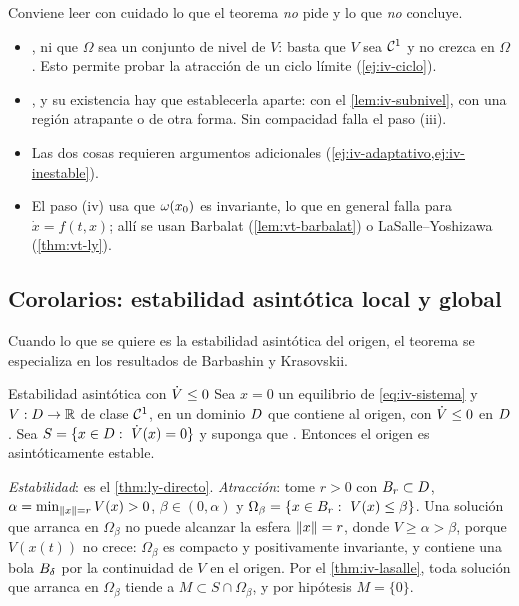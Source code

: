Conviene leer con cuidado lo que el teorema \emph{no} pide y lo que \emph{no} concluye.
\begin{itemize}
  \item {}, ni que $\Omega$ sea un conjunto de nivel de $V$: basta que $V$ sea $\mathcal{C}^{1}$ y no crezca en $\Omega$. Esto permite probar la atracción de un ciclo límite (\cref{ej:iv-ciclo}).
  \item {}, y su existencia hay que establecerla aparte: con el \cref{lem:iv-subnivel}, con una región atrapante o de otra forma. Sin compacidad falla el paso (iii).
  \item {} Las dos cosas requieren argumentos adicionales (\cref{ej:iv-adaptativo,ej:iv-inestable}).
  \item {} El paso (iv) usa que $\omega(x_0)$ es invariante, lo que en general falla para $\dot x=f(t,x)$; allí se usan Barbalat (\cref{lem:vt-barbalat}) o LaSalle--Yoshizawa (\cref{thm:vt-ly}).
\end{itemize}

\subsection{Corolarios: estabilidad asintótica local y global}

Cuando lo que se quiere es la estabilidad asintótica del origen, el teorema se especializa en los resultados de Barbashin y Krasovskii.

\begin{corolario}[label=cor:iv-as]{Estabilidad asintótica con $\dot V\le0$ \citep[Cor.~4.1]{Kha02}}
Sea $x=0$ un equilibrio de \eqref{eq:iv-sistema} y $V:D\to\mathbb{R}$ de clase $\mathcal{C}^{1}$,  en un dominio $D$ que contiene al origen, con $\dot V\le0$ en $D$. Sea $S=\{x\in D:\ \dot V(x)=0\}$ y suponga que . Entonces el origen es asintóticamente estable.
\end{corolario}

\begin{demostracion}
\emph{Estabilidad}: es el \cref{thm:ly-directo}. \emph{Atracción}: tome $r>0$ con $B_{r}\subset D$, $\alpha=\min_{\left\lVert x\right\rVert=r}V(x)>0$, $\beta\in(0,\alpha)$ y $\Omega_\beta=\{x\in\Bola r:\ V(x)\le\beta\}$. Una solución que arranca en $\Omega_\beta$ no puede alcanzar la esfera $\left\lVert x\right\rVert=r$, donde $V\ge\alpha>\beta$, porque $V(x(t))$ no crece: $\Omega_\beta$ es compacto y positivamente invariante, y contiene una bola $B_{\delta}$ por la continuidad de $V$ en el origen. Por el \cref{thm:iv-lasalle}, toda solución que arranca en $\Omega_\beta$ tiende a $M\subset S\cap\Omega_\beta$, y por hipótesis $M=\{0\}$.
\end{demostracion}

